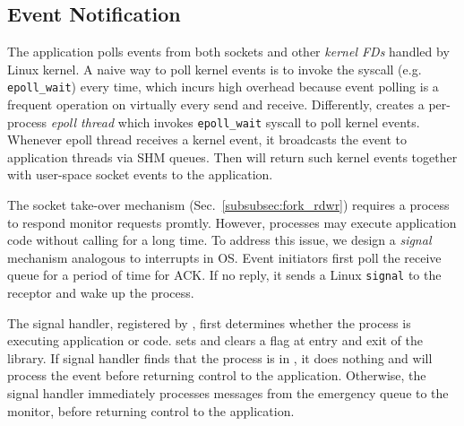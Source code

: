 \subsection{Event Notification}
\label{subsec:process-mux}

The application polls events from both sockets and other \textit{kernel FDs} handled by Linux kernel.
A naive way to poll kernel events is to invoke the syscall (e.g. \texttt{epoll\_wait}) every time, which incurs high overhead because event polling is a frequent operation on virtually every send and receive.
Differently, \libipc{} creates a per-process \textit{epoll thread} which invokes \texttt{epoll\_wait} syscall to poll kernel events. Whenever epoll thread receives a kernel event, it broadcasts the event to application threads via SHM queues. Then \libipc{} will return such kernel events together with user-space socket events to the application.

The socket take-over mechanism (Sec.~\ref{subsubsec:fork_rdwr}) requires a process to respond monitor requests promtly. However, processes may execute application code without calling \libipc{} for a long time. To address this issue, we design a \textit{signal} mechanism analogous to interrupts in OS. Event initiators  first poll the receive queue for a period of time for ACK. If no reply, it sends a Linux \texttt{signal} to the receptor and wake up the process.

The signal handler, registered by \libipc{}, first determines whether the process is executing application or \libipc{} code. \libipc{} sets and clears a flag at entry and exit of the library. If signal handler finds that the process is in \libipc, it does nothing and \libipc{} will process the event before returning control to the application. Otherwise, the signal handler immediately processes messages from the emergency queue to the monitor, before returning control to the application. 

